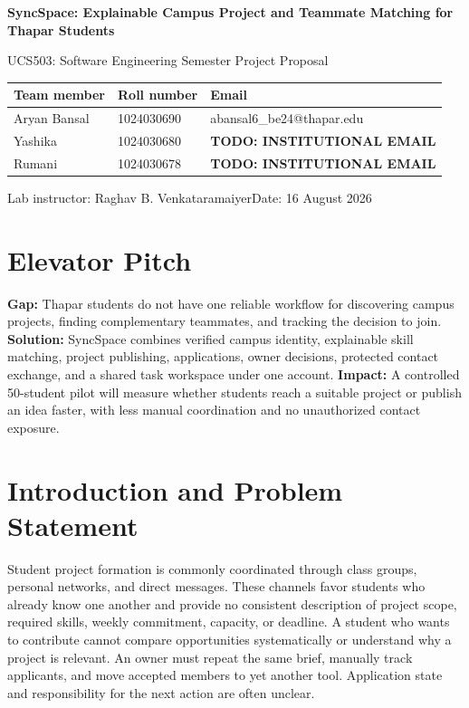 \documentclass[11pt,a4paper]{article}
\makeatletter
\newcommand{\projecttitle}{SyncSpace: Explainable Campus Project and Teammate Matching for Thapar Students}
\newcommand{\studentone}{Aryan Bansal}
\newcommand{\rollone}{1024030690}
\newcommand{\emailone}{abansal6\_be24@thapar.edu}
\newcommand{\studenttwo}{Yashika}
\newcommand{\rolltwo}{1024030680}
\newcommand{\emailtwo}{\textbf{TODO: INSTITUTIONAL EMAIL}}
\newcommand{\studentthree}{Rumani}
\newcommand{\rollthree}{1024030678}
\newcommand{\emailthree}{\textbf{TODO: INSTITUTIONAL EMAIL}}
\newcommand{\instructor}{Raghav B. Venkataramaiyer}
\makeatother
\begin{document}
\begin{center}
    {\Large\bfseries \projecttitle\par}
    \vspace{3pt}
    {\large UCS503: Software Engineering Semester Project Proposal\par}
    \vspace{7pt}
    \begin{tabular}{lll}
        \toprule
        Team member & Roll number & Email \\
        \midrule
        \studentone & \rollone & \emailone \\
        \studenttwo & \rolltwo & \emailtwo \\
        \studentthree & \rollthree & \emailthree \\
        \bottomrule
    \end{tabular}

    \vspace{5pt}
    Lab instructor: \instructor \hfill Date: 16 August 2026
\end{center}

\section{Elevator Pitch}

\textbf{Gap:} Thapar students do not have one reliable workflow for discovering campus projects, finding complementary teammates, and tracking the decision to join. \textbf{Solution:} SyncSpace combines verified campus identity, explainable skill matching, project publishing, applications, owner decisions, protected contact exchange, and a shared task workspace under one account. \textbf{Impact:} A controlled 50-student pilot will measure whether students reach a suitable project or publish an idea faster, with less manual coordination and no unauthorized contact exposure.

\section{Introduction and Problem Statement}

Student project formation is commonly coordinated through class groups, personal networks, and direct messages. These channels favor students who already know one another and provide no consistent description of project scope, required skills, weekly commitment, capacity, or deadline. A student who wants to contribute cannot compare opportunities systematically or understand why a project is relevant. An owner must repeat the same brief, manually track applicants, and move accepted members to yet another tool. Application state and responsibility for the next action are often unclear.
\end{document}
